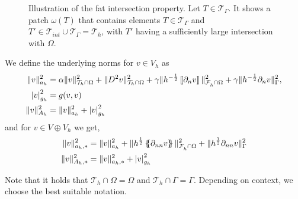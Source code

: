 \begin{figure}[t]
\begin{tikzpicture}
    \end{tikzpicture}
\caption{Illustration of the fat intersection property. Let $T \in \mathcal{T}_{\Gamma } $. It shows a patch $\omega ( T) $ that contains elements $T \in  \mathcal{T}_{\Gamma } $ and $T'\in \mathcal{T} _{int} \cup \mathcal{T} _{\Gamma } = \mathcal{T} _{h}$, with $T' $ having a sufficiently large intersection with $\Omega$.}
    \label{fig:fat_intersection_property}
\end{figure}


We define the underlying norms for $ v \in V_{h} $ as
    \begin{align}
        \label{eq:bi_ah_norm}
        \| v \|_{ a_{h} }^{ 2 } & =    \alpha \|   v \|_{ \mathcal{T} _{h} \cap \Omega  }^{ 2}  + \| D^2 v \|_{\mathcal{T} _{h} \cap \Omega   }^{ 2 } + \gamma \| h^{-\frac{1}{2}} \jump{ \partial _{n} v }   \|_{ \mathcal{F}_{h}^{}\cap \Omega    }^{ 2
        } + \gamma \| h^{-\frac{1}{2}}  \partial _{n} v    \|_{ \Gamma   }^{ 2 },    \\
        \label{eq:bi_gh_norm}
\abs{ v } _{g_{h}}^{2} & = g( v,v) \\
        \label{eq:bi_Ah_norm}
\| v \|_{A_{h}  }^{  2}  & = \| v \|_{ a_{h} }^{ 2 } + \abs{ v } _{g_{h}}^{2} \\
    \end{align}
and for $v \in V \oplus V_{h}$ we get, \[
    \begin{split}
\| v \|_{ a_{h}, * }^{  2} & =\| v \|_{ a_{h} }^{ 2 } +  \| h^{\frac{1}{2}} \mean{ \partial _{nn} v }   \|_{\mathcal{F} _{h}^{} \cap \Omega   }^{  2} +  \| h^{\frac{1}{2}} \partial _{nn} v    \|_{ \Gamma }^{  2}  \\
\| v \|_{A_{h},*  }^{  2}  & = \| v \|_{ a_{h},* }^{ 2 } + \abs{ v } _{g_{h}}^{2}
    \end{split}
\]
\begin{remark}
Note that it holds that $\mathcal{T} _{h} \cap  \Omega   = \Omega  $ and $\mathcal{T} _{h} \cap  \Gamma  = \Gamma $. Depending on context, we choose the best suitable notation.
\end{remark}



